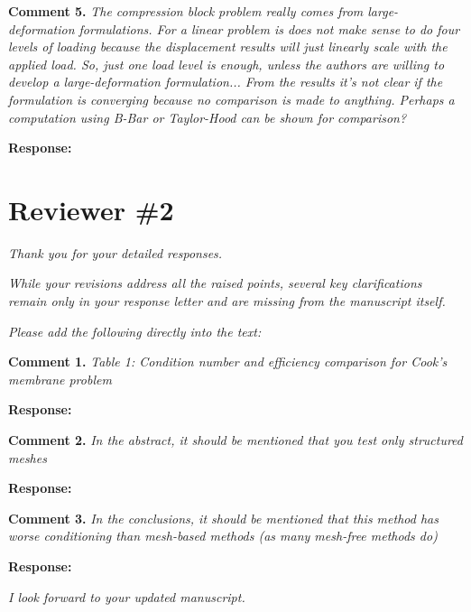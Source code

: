 \documentclass{article}
\begin{document}
\textbf{Comment 5.} \textit{The compression block problem really comes from large-deformation formulations. For a linear problem is does not make sense to do four levels of loading because the displacement results will just linearly scale with the applied load. So, just one load level is enough, unless the authors are willing to develop a large-deformation formulation... From the results it's not clear if the formulation is converging because no comparison is made to anything. Perhaps a computation using B-Bar or Taylor-Hood can be shown for comparison?}

\textbf{Response:} 

\section*{Reviewer \#2}

\textit{Thank you for your detailed responses.}

\textit{While your revisions address all the raised points, several key clarifications remain only in your response letter and are missing from the manuscript itself.}

\textit{Please add the following directly into the text:}

\textbf{Comment 1.} \textit{ Table 1: Condition number and eﬀiciency comparison for Cook's membrane problem}

\textbf{Response:}

\textbf{Comment 2.} \textit{ In the abstract, it should be mentioned that you test only structured meshes}

\textbf{Response:} 

\textbf{Comment 3.} \textit{In the conclusions, it should be mentioned that this method has worse conditioning than mesh-based methods (as many mesh-free methods do)}

\textbf{Response:}

\textit{I look forward to your updated manuscript.}


% 
\end{document}
